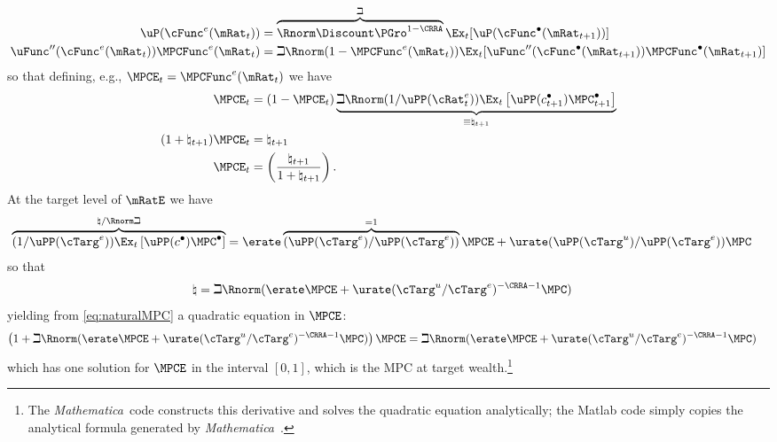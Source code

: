\documentclass{\handout}
\begin{document}
\begin{equation}\begin{gathered}\begin{aligned}
  \uP(\cFunc^{e}(\mRat_{t})) & = \overbrace{\Rnorm \Discount \PGro^{1-\CRRA}}^{\beth} \Ex_{t}[\uP(\cFunc^{\bullet}(\mRat_{t+1}))]
\\  \uFunc^{\prime\prime}(\cFunc^{e}(\mRat_{t}))\MPCFunc^{e}(\mRat_{t}) & = \beth  \Rnorm (1-\MPCFunc^{e}(\mRat_{t}))\Ex_{t}[\uFunc^{\prime\prime}(\cFunc^{\bullet}(\mRat_{t+1}))\MPCFunc^{\bullet}(\mRat_{t+1})] \label{eq:dEuler}
\end{aligned}\end{gathered}\end{equation}
so that defining, e.g., $\MPCE_{t} = \MPCFunc^{e}(\mRat_{t})$ we have 
\begin{align}
 \MPCE_{t} & =  (1-\MPCE_{t}) \underbrace{\beth \Rnorm (1/\uPP({\cRat}^{e}_{t}))\Ex_{t}\left[\uPP(c^{\bullet}_{t+1})\MPC^{\bullet}_{t+1}\right]}_{\equiv \natural_{t+1}} \label{eq:natural}
\\ (1+\natural_{t+1})\MPCE_{t} & = \natural_{t+1} \label{eq:naturalMPC}
\\ \MPCE_{t} & = \left(\frac{\natural_{t+1}}{1+\natural_{t+1}}\right) \label{eq:naturalSolved}
.
\end{align}
\newcommand{\Mma}{{\it Mathematica}~}
At the target level of $\mRatE$ we have 
\begin{equation*}\begin{gathered}\begin{aligned}
  \overbrace{(1/\uPP(\cTarg^{e}))\Ex_{t}\left[\uPP(c^{\bullet})\MPC^{\bullet}\right]}^{\natural / \Rnorm \beth} & =  \erate \overbrace{(\uPP(\cTarg^{e})/\uPP(\cTarg^{e}))}^{=1}\MPCE+\urate (\uPP(\cTarg^{u})/\uPP(\cTarg^{e}))\MPCU
\end{aligned}\end{gathered}\end{equation*}
so that 
\begin{equation}\begin{gathered}\begin{aligned}
  \natural & =   \beth \Rnorm (\erate \MPCE + \urate (\cTarg^{u}/\cTarg^{e})^{-\CRRA-1} \MPCU)
\end{aligned}\end{gathered}\end{equation}
yielding from \eqref{eq:naturalMPC} a quadratic equation in $\MPCE$:
\begin{equation}\begin{gathered}\begin{aligned}
  \left(1+\beth \Rnorm (\erate \MPCE + \urate (\cTarg^{u}/\cTarg^{e})^{-\CRRA-1}  \MPCU) \right)\MPCE & =  \beth \Rnorm (\erate \MPCE + \urate (\cTarg^{u}/\cTarg^{e})^{-\CRRA-1} \MPCU) \label{eq:quadraticForTargetMPC}
\end{aligned}\end{gathered}\end{equation} 
which has one solution for $\MPCE$ in the interval $[0,1]$, which is the MPC at target wealth.\footnote{The 
\Mma code constructs this derivative and solves the quadratic equation analytically; the Matlab code simply copies
the analytical formula generated by \Mma.}
\end{document}
